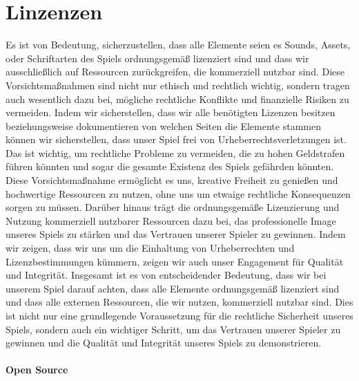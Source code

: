 
\chapter{Linzenzen}\label{ch:lizenzen}
\renewcommand{\kapitelautor}{Autor: Nils Hubmann} %

%
Es ist von Bedeutung, sicherzustellen, dass alle Elemente seien es Sounds, Assets, oder Schriftarten des Spiels ordnungsgemäß lizenziert sind und dass wir ausschließlich auf Ressourcen zurückgreifen, die kommerziell nutzbar sind.
Diese Vorsichtsmaßnahmen sind nicht nur ethisch und rechtlich wichtig, sondern tragen auch wesentlich dazu bei, mögliche rechtliche Konflikte und finanzielle Risiken zu vermeiden.
Indem wir sicherstellen, dass wir alle benötigten Lizenzen besitzen beziehungsweise dokumentieren von welchen Seiten die Elemente stammen können wir sicherstellen, dass unser Spiel frei von Urheberrechtsverletzungen ist.
Das ist wichtig, um rechtliche Probleme zu vermeiden, die zu hohen Geldstrafen führen könnten und sogar die gesamte Existenz des Spiels gefährden könnten.
Diese Vorsichtsmaßnahme ermöglicht es uns, kreative Freiheit zu genießen und hochwertige Ressourcen zu nutzen, ohne uns um etwaige rechtliche Konsequenzen sorgen zu müssen.
Darüber hinaus trägt die ordnungsgemäße Lizenzierung und Nutzung kommerziell nutzbarer Ressourcen dazu bei, das professionelle Image unseres Spiels zu stärken und das Vertrauen unserer Spieler zu gewinnen.
Indem wir zeigen, dass wir uns um die Einhaltung von Urheberrechten und Lizenzbestimmungen kümmern, zeigen wir auch unser Engagement für Qualität und Integrität.
Insgesamt ist es von entscheidender Bedeutung, dass wir bei unserem Spiel darauf achten, dass alle Elemente ordnungsgemäß lizenziert sind und dass alle externen Ressourcen,
die wir nutzen, kommerziell nutzbar sind. Dies ist nicht nur eine grundlegende Voraussetzung für die rechtliche Sicherheit unseres Spiels, sondern auch ein wichtiger Schritt,
um das Vertrauen unserer Spieler zu gewinnen und die Qualität und Integrität unseres Spiels zu demonstrieren.
%
\subsubsection{Open Source}\label{subsubsec:Open-Source}
%

